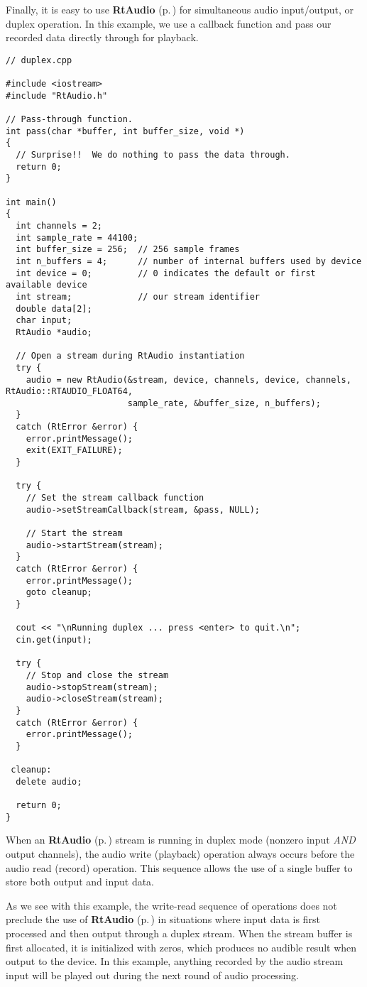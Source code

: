 Finally, it is easy to use {\bf Rt\-Audio} {\rm (p.\,\pageref{classRtAudio})} for simultaneous audio input/output, or duplex operation. In this example, we use a callback function and pass our recorded data directly through for playback.

\footnotesize\begin{verbatim}// duplex.cpp

#include <iostream>
#include "RtAudio.h"

// Pass-through function.
int pass(char *buffer, int buffer_size, void *)
{
  // Surprise!!  We do nothing to pass the data through.
  return 0;
}

int main()
{
  int channels = 2;
  int sample_rate = 44100;
  int buffer_size = 256;  // 256 sample frames
  int n_buffers = 4;      // number of internal buffers used by device
  int device = 0;         // 0 indicates the default or first available device
  int stream;             // our stream identifier
  double data[2];
  char input;
  RtAudio *audio;

  // Open a stream during RtAudio instantiation
  try {
    audio = new RtAudio(&stream, device, channels, device, channels, RtAudio::RTAUDIO_FLOAT64,
                        sample_rate, &buffer_size, n_buffers);
  }
  catch (RtError &error) {
    error.printMessage();
    exit(EXIT_FAILURE);
  }

  try {
    // Set the stream callback function
    audio->setStreamCallback(stream, &pass, NULL);

    // Start the stream
    audio->startStream(stream);
  }
  catch (RtError &error) {
    error.printMessage();
    goto cleanup;
  }

  cout << "\nRunning duplex ... press <enter> to quit.\n";
  cin.get(input);

  try {
    // Stop and close the stream
    audio->stopStream(stream);
    audio->closeStream(stream);
  }
  catch (RtError &error) {
    error.printMessage();
  }

 cleanup:
  delete audio;

  return 0;
}\end{verbatim}\normalsize 


When an {\bf Rt\-Audio} {\rm (p.\,\pageref{classRtAudio})} stream is running in duplex mode (nonzero input {\em AND} output channels), the audio write (playback) operation always occurs before the audio read (record) operation. This sequence allows the use of a single buffer to store both output and input data.

As we see with this example, the write-read sequence of operations does not preclude the use of {\bf Rt\-Audio} {\rm (p.\,\pageref{classRtAudio})} in situations where input data is first processed and then output through a duplex stream. When the stream buffer is first allocated, it is initialized with zeros, which produces no audible result when output to the device. In this example, anything recorded by the audio stream input will be played out during the next round of audio processing.

